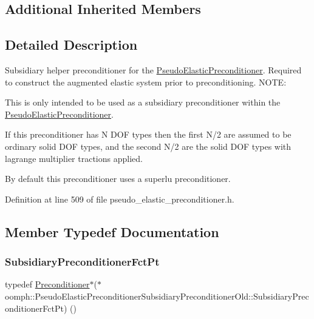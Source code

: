 \subsection*{Additional Inherited Members}


\subsection{Detailed Description}
Subsidiary helper preconditioner for the \hyperlink{classoomph_1_1PseudoElasticPreconditioner}{Pseudo\+Elastic\+Preconditioner}. Required to construct the augmented elastic system prior to preconditioning. N\+O\+TE\+:
\begin{DoxyEnumerate}
\item This is only intended to be used as a subsidiary preconditioner within the \hyperlink{classoomph_1_1PseudoElasticPreconditioner}{Pseudo\+Elastic\+Preconditioner}.
\item If this preconditioner has N D\+OF types then the first N/2 are assumed to be ordinary solid D\+OF types, and the second N/2 are the solid D\+OF types with lagrange multiplier tractions applied.
\item By default this preconditioner uses a superlu preconditioner. 
\end{DoxyEnumerate}

Definition at line 509 of file pseudo\+\_\+elastic\+\_\+preconditioner.\+h.



\subsection{Member Typedef Documentation}
\mbox{\label{classoomph_1_1PseudoElasticPreconditionerSubsidiaryPreconditionerOld_a2ee5b7ddad26a4eb6662e2b701ab0a52}} 
\subsubsection{\texorpdfstring{Subsidiary\+Preconditioner\+Fct\+Pt}{SubsidiaryPreconditionerFctPt}}
{\footnotesize\ttfamily typedef \hyperlink{classoomph_1_1Preconditioner}{Preconditioner}$\ast$($\ast$ oomph\+::\+Pseudo\+Elastic\+Preconditioner\+Subsidiary\+Preconditioner\+Old\+::\+Subsidiary\+Preconditioner\+Fct\+Pt) ()}



